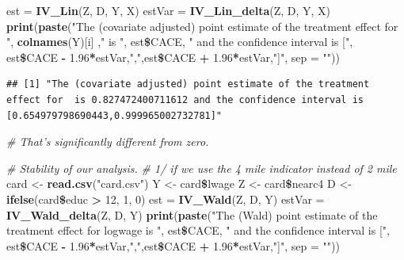 \documentclass[]{article}
\newenvironment{Shaded}{\begin{snugshade}}{\end{snugshade}}
\newcommand{\KeywordTok}[1]{\textcolor[rgb]{0.13,0.29,0.53}{\textbf{#1}}}
\newcommand{\DataTypeTok}[1]{\textcolor[rgb]{0.13,0.29,0.53}{#1}}
\newcommand{\DecValTok}[1]{\textcolor[rgb]{0.00,0.00,0.81}{#1}}
\newcommand{\FloatTok}[1]{\textcolor[rgb]{0.00,0.00,0.81}{#1}}
\newcommand{\StringTok}[1]{\textcolor[rgb]{0.31,0.60,0.02}{#1}}
\newcommand{\CommentTok}[1]{\textcolor[rgb]{0.56,0.35,0.01}{\textit{#1}}}
\newcommand{\OperatorTok}[1]{\textcolor[rgb]{0.81,0.36,0.00}{\textbf{#1}}}
\newcommand{\NormalTok}[1]{#1}
\begin{document}
\begin{Shaded}
\begin{Highlighting}[]
\NormalTok{est =}\StringTok{ }\KeywordTok{IV_Lin}\NormalTok{(Z, D, Y, X)}
\NormalTok{estVar =}\StringTok{ }\KeywordTok{IV_Lin_delta}\NormalTok{(Z, D, Y, X)}
\KeywordTok{print}\NormalTok{(}\KeywordTok{paste}\NormalTok{(}\StringTok{"The (covariate adjusted) point estimate of the treatment effect for "}\NormalTok{, }\KeywordTok{colnames}\NormalTok{(Y)[i] ,}\StringTok{" is "}\NormalTok{, est}\OperatorTok{\$}\NormalTok{CACE, }\StringTok{" and the confidence interval is ["}\NormalTok{, est}\OperatorTok{\$}\NormalTok{CACE }\OperatorTok{-}\StringTok{ }\FloatTok{1.96}\OperatorTok{*}\NormalTok{estVar,}\StringTok{","}\NormalTok{,est}\OperatorTok{\$}\NormalTok{CACE }\OperatorTok{+}\StringTok{ }\FloatTok{1.96}\OperatorTok{*}\NormalTok{estVar,}\StringTok{"]"}\NormalTok{, }\DataTypeTok{sep =} \StringTok{""}\NormalTok{))}
\end{Highlighting}
\end{Shaded}

\begin{verbatim}
## [1] "The (covariate adjusted) point estimate of the treatment effect for  is 0.827472400711612 and the confidence interval is [0.654979798690443,0.999965002732781]"
\end{verbatim}

\begin{Shaded}
\begin{Highlighting}[]
\CommentTok{# That's significantly different from zero.}
\end{Highlighting}
\end{Shaded}

\begin{Shaded}
\begin{Highlighting}[]
\CommentTok{# Stability of our analysis.}
\CommentTok{# 1/ if we use the 4 mile indicator instead of 2 mile}
\NormalTok{card <-}\StringTok{ }\KeywordTok{read.csv}\NormalTok{(}\StringTok{"card.csv"}\NormalTok{)}
\NormalTok{Y <-}\StringTok{ }\NormalTok{card}\OperatorTok{\$}\NormalTok{lwage}
\NormalTok{Z <-}\StringTok{ }\NormalTok{card}\OperatorTok{\$}\NormalTok{nearc4}
\NormalTok{D <-}\StringTok{ }\KeywordTok{ifelse}\NormalTok{(card}\OperatorTok{\$}\NormalTok{educ }\OperatorTok{>}\StringTok{ }\DecValTok{12}\NormalTok{, }\DecValTok{1}\NormalTok{, }\DecValTok{0}\NormalTok{)}
\NormalTok{est =}\StringTok{ }\KeywordTok{IV_Wald}\NormalTok{(Z, D, Y)}
\NormalTok{estVar =}\StringTok{ }\KeywordTok{IV_Wald_delta}\NormalTok{(Z, D, Y)}
\KeywordTok{print}\NormalTok{(}\KeywordTok{paste}\NormalTok{(}\StringTok{"The (Wald) point estimate of the treatment effect for logwage is "}\NormalTok{, est}\OperatorTok{\$}\NormalTok{CACE, }\StringTok{" and the confidence interval is ["}\NormalTok{, est}\OperatorTok{\$}\NormalTok{CACE }\OperatorTok{-}\StringTok{ }\FloatTok{1.96}\OperatorTok{*}\NormalTok{estVar,}\StringTok{","}\NormalTok{,est}\OperatorTok{\$}\NormalTok{CACE }\OperatorTok{+}\StringTok{ }\FloatTok{1.96}\OperatorTok{*}\NormalTok{estVar,}\StringTok{"]"}\NormalTok{, }\DataTypeTok{sep =} \StringTok{""}\NormalTok{))}
\end{Highlighting}
\end{Shaded}
\end{document}

